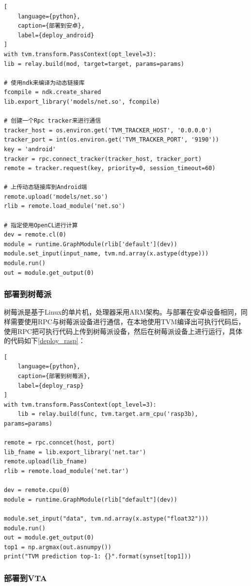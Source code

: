 \begin{lstlisting}[
    language={python},
    caption={部署到安卓},
    label={deploy_android}
]
with tvm.transform.PassContext(opt_level=3):
lib = relay.build(mod, target=target, params=params)

# 使用ndk来编译为动态链接库
fcompile = ndk.create_shared
lib.export_library('models/net.so', fcompile)

# 创建一个Rpc tracker来进行通信
tracker_host = os.environ.get('TVM_TRACKER_HOST', '0.0.0.0')
tracker_port = int(os.environ.get('TVM_TRACKER_PORT', '9190'))
key = 'android'
tracker = rpc.connect_tracker(tracker_host, tracker_port)
remote = tracker.request(key, priority=0, session_timeout=60)

# 上传动态链接库到Android端
remote.upload('models/net.so')
rlib = remote.load_module('net.so')

# 指定使用OpenCL进行计算
dev = remote.cl(0)
module = runtime.GraphModule(rlib['default'](dev))
module.set_input(input_name, tvm.nd.array(x.astype(dtype)))
module.run()
out = module.get_output(0)
\end{lstlisting}

\subsubsection{部署到树莓派}

树莓派是基于Linux的单片机，处理器采用ARM架构。与部署在安卓设备相同，同样需要使用RPC与树莓派设备进行通信，在本地使用TVM编译出可执行代码后，使用RPC把可执行代码上传到树莓派设备，然后在树莓派设备上进行运行，具体的代码如下\ref{deploy_rasp}：

\begin{lstlisting}[
    language={python},
    caption={部署到树莓派},
    label={deploy_rasp}
]
with tvm.transform.PassContext(opt_level=3):
    lib = relay.build(func, tvm.target.arm_cpu('rasp3b), params=params)

remote = rpc.conncet(host, port)
lib_fname = lib.export_library('net.tar')
remote.upload(lib_fname)
rlib = remote.load_module('net.tar')

dev = remote.cpu(0)
module = runtime.GraphModule(rlib["default"](dev))

module.set_input("data", tvm.nd.array(x.astype("float32")))
module.run()
out = module.get_output(0)
top1 = np.argmax(out.asnumpy())
print("TVM prediction top-1: {}".format(synset[top1]))
\end{lstlisting}

\subsubsection{部署到VTA}

